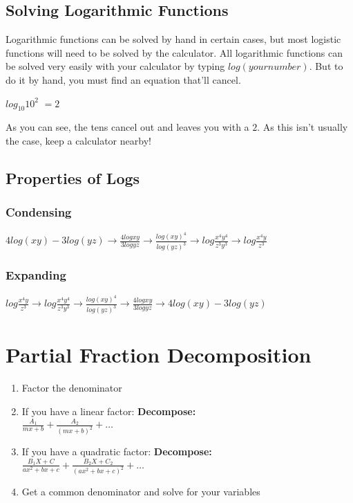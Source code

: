 \documentclass[12pt, english]{article}
\begin{document}
	\subsection{Solving Logarithmic Functions}
	Logarithmic functions can be solved by hand in certain cases, but most logistic functions will need to be solved by the calculator.
	All logarithmic functions can be solved very easily with your calculator by typing $log(your number)$. But to do it by hand, you must
	find an equation that'll cancel.
	\begin{center}
		\sout{$log_{10}10^2$} $= 2$
	\end{center}
	As you can see, the tens cancel out and leaves you with a $2$. As this isn't usually the case, keep a calculator nearby!
	\subsection{Properties of Logs}
	\subsubsection{Condensing}
	\begin{center}
		$4log(xy)-3log(yz) \to \frac{4logxy}{3logyz} \to \frac{log(xy)^4}{log(yz)^3} \to log\frac{x^4y^4}{z^3y^3} \to log\frac{x^4y}{z^3}$
	\end{center}
	\subsubsection{Expanding}
	\begin{center}
		$log\frac{x^4y}{z^3} \to log\frac{x^4y^4}{z^3y^3} \to \frac{log(xy)^4}{log(yz)^3} \to \frac{4logxy}{3logyz} \to 4log(xy)-3log(yz)$
	\end{center}
	\section{Partial Fraction Decomposition}
	\begin{enumerate}
		\item Factor the denominator
		\item If you have a linear factor:\vspace{5mm}
		\textbf{Decompose:}\\
		$\frac{A_1}{mx+b} + \frac{A_2}{(mx+b)^2} + \dots$
		\item If you have a quadratic factor:\vspace{5mm}
		\textbf{Decompose:}\\
		$\frac{B_1X+C}{ax^2+bx+c}+\frac{B_2X+C_2}{(ax^2+bx+c)^2}+\dots$
		\item Get a common denominator and solve for your variables
	\end{enumerate}
\end{document}
